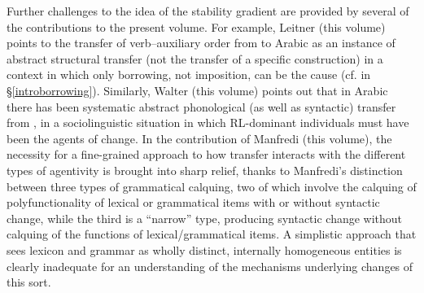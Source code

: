 \documentclass[output=paper]{langsci/langscibook}
\begin{document}
Further challenges to the idea of the stability gradient are provided by several of the contributions to the present volume. For example, Leitner (this volume) points to the transfer of verb--auxiliary order from  to  Arabic as an instance of abstract structural transfer (not the transfer of a specific construction) in a context in which only borrowing, not imposition, can be the cause (cf.  in §\ref{introborrowing}). Similarly, Walter (this volume) points out that in  Arabic there has been systematic abstract phonological (as well as syntactic) transfer from , in a sociolinguistic situation in which RL-dominant individuals must have been the agents of change. In the contribution of Manfredi (this volume), the necessity for a fine-grained approach to how transfer interacts with the different types of agentivity is brought into sharp relief, thanks to Manfredi's distinction between three types of grammatical calquing, two of which involve the calquing of polyfunctionality of lexical or grammatical items with or without syntactic change, while the third is a “narrow” type, producing syntactic change without calquing of the functions of lexical/grammatical items. A simplistic approach that sees lexicon and grammar as wholly distinct, internally homogeneous entities is clearly inadequate for an understanding of the mechanisms underlying changes of this sort.
\end{document}
